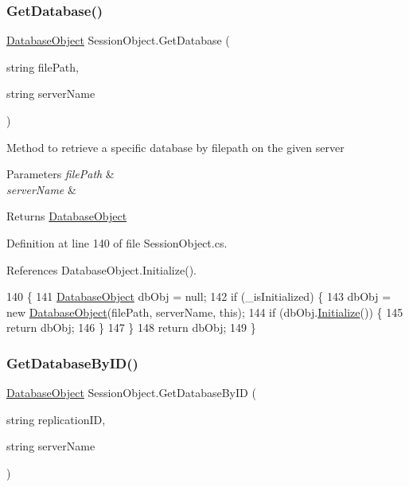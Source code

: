 \subsubsection{\texorpdfstring{Get\+Database()}{GetDatabase()}}
{\footnotesize\ttfamily \hyperlink{class_database_object}{Database\+Object} Session\+Object.\+Get\+Database (\begin{DoxyParamCaption}\item[{string}]{file\+Path,  }\item[{string}]{server\+Name }\end{DoxyParamCaption})}



Method to retrieve a specific database by filepath on the given server 


\begin{DoxyParams}{Parameters}
{\em file\+Path} & \\
\hline
{\em server\+Name} & \\
\hline
\end{DoxyParams}
\begin{DoxyReturn}{Returns}
\hyperlink{class_database_object}{Database\+Object}
\end{DoxyReturn}


Definition at line 140 of file Session\+Object.\+cs.



References Database\+Object.\+Initialize().


\begin{DoxyCode}
140                                                                           \{
141         \hyperlink{class_database_object}{DatabaseObject} dbObj = null;
142         \textcolor{keywordflow}{if} (\_isInitialized) \{
143             dbObj = \textcolor{keyword}{new} \hyperlink{class_database_object}{DatabaseObject}(filePath, serverName, \textcolor{keyword}{this});
144             \textcolor{keywordflow}{if} (dbObj.\hyperlink{class_database_object_a7de43a21bd287deec537cffec343f41d}{Initialize}()) \{
145                 \textcolor{keywordflow}{return} dbObj;
146             \}
147         \}
148         \textcolor{keywordflow}{return} dbObj;
149     \}
\end{DoxyCode}
\mbox{\label{class_session_object_ae53bad1d2fe161060ae409024b3e0de4}} 
\subsubsection{\texorpdfstring{Get\+Database\+By\+I\+D()}{GetDatabaseByID()}}
{\footnotesize\ttfamily \hyperlink{class_database_object}{Database\+Object} Session\+Object.\+Get\+Database\+By\+ID (\begin{DoxyParamCaption}\item[{string}]{replication\+ID,  }\item[{string}]{server\+Name }\end{DoxyParamCaption})}



